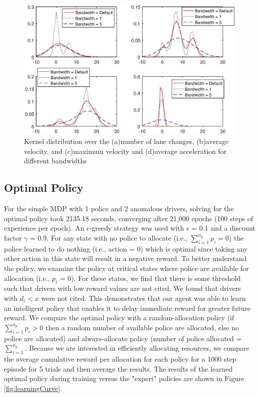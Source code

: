 \documentclass[10pt,journal]{IEEEtran}
\begin{document}
\begin{figure}[!t]
	\centering
    \includegraphics[width=1.1\columnwidth]{"Figures/distribution_drivers"}
    \caption{Kernel distribution over the (a)number of lane changes, (b)average velocity, and (c)maximum velocity and (d)average acceleration for different bandwidths}
    \label{fig:KernDistri}
\end{figure}

\subsection{Optimal Policy}
For the simple MDP with 1 police and 2 anomalous drivers, solving for the optimal policy took 2135.18 seconds, converging after 21,000 epochs (100 steps of experience per epoch). An $\epsilon$-greedy strategy was used with $\epsilon$ = 0.1 and a discount factor $\gamma$ = 0.9. For any state with no police to allocate (i.e., $\sum_{i=1}^{n_p} p_i = 0$) the police learned to do nothing (i.e., action = 0) which is optimal since taking any other action in this state will result in a negative reward. To better understand the policy, we examine the policy at critical states where police are available for allocation (i.e., $p_i$ = 0). For these states, we find that there is some threshold such that drivers with low reward values are not cited. We found that drivers with $d_i < x$ were not cited. This demonstrates that our agent was able to learn an intelligent policy that enables it to delay immediate reward for greater future reward. We compare the optimal policy with a random-allocation policy (if $\sum_{i=1}^{n_p} p_i > 0$ then a random number of available police are allocated, else no police are allocated) and always-allocate policy (number of police allocated = $\sum_{i=1}^{n_p}$. Because we are interested in efficiently allocating resources, we compare the average cumulative reward per allocation for each policy for a 1000 step episode for 5 trials and then average the results. The results of the learned optimal policy during training versus the "expert" policies are shown in Figure \ref{fig:learningCurve}.\\
\end{document}
